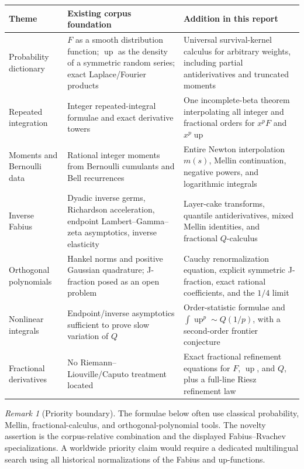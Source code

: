 \documentclass[11pt,oneside]{article}
\numberwithin{equation}{section}
\theoremstyle{definition}
\theoremstyle{remark}
\newtheorem{remark}[theorem]{Remark}
\newcommand{\Up}{\operatorname{up}}
\begin{document}
\begin{center}
\small
\begin{tabularx}{0.98\textwidth}{@{}p{}X X@{}}
\toprule
Theme & Existing corpus foundation & Addition in this report \\
\midrule
Probability dictionary
& \(F\) as a smooth distribution function; \(\Up\) as the density of a
symmetric random series; exact Laplace/Fourier products
& Universal survival-kernel calculus for arbitrary weights, including partial
antiderivatives and truncated moments \\
Repeated integration
& Integer repeated-integral formulae and exact derivative towers
& One incomplete-beta theorem interpolating all integer and fractional orders
for \(x^pF\) and \(x^p\Up\) \\
Moments and Bernoulli data
& Rational integer moments from Bernoulli cumulants and Bell recurrences
& Entire Newton interpolation \(m(s)\), Mellin continuation, negative powers,
and logarithmic integrals \\
Inverse Fabius
& Dyadic inverse germs, Richardson acceleration, endpoint Lambert--Gamma--zeta
asymptotics, inverse elasticity
& Layer-cake transforms, quantile antiderivatives, mixed Mellin identities, and
fractional \(Q\)-calculus \\
Orthogonal polynomials
& Hankel norms and positive Gaussian quadrature; J-fraction posed as an open
problem
& Cauchy renormalization equation, explicit symmetric J-fraction, exact rational
coefficients, and the \(1/4\) limit \\
Nonlinear integrals
& Endpoint/inverse asymptotics sufficient to prove slow variation of \(Q\)
& Order-statistic formulae and \(\int\Up^p\sim Q(1/p)\), with a second-order
frontier conjecture \\
Fractional derivatives
& No Riemann--Liouville/Caputo treatment located
& Exact fractional refinement equations for \(F\), \(\Up\), and \(Q\), plus a
full-line Riesz refinement law \\
\bottomrule
\end{tabularx}
\end{center}

\begin{remark}[Priority boundary]
The formulae below often use classical probability, Mellin, fractional-calculus,
and orthogonal-polynomial tools.  The novelty assertion is the corpus-relative
combination and the displayed Fabius--Rvachev specializations.  A worldwide
priority claim would require a dedicated multilingual search using all historical
normalizations of the Fabius and up-functions.
\end{remark}
\end{document}
